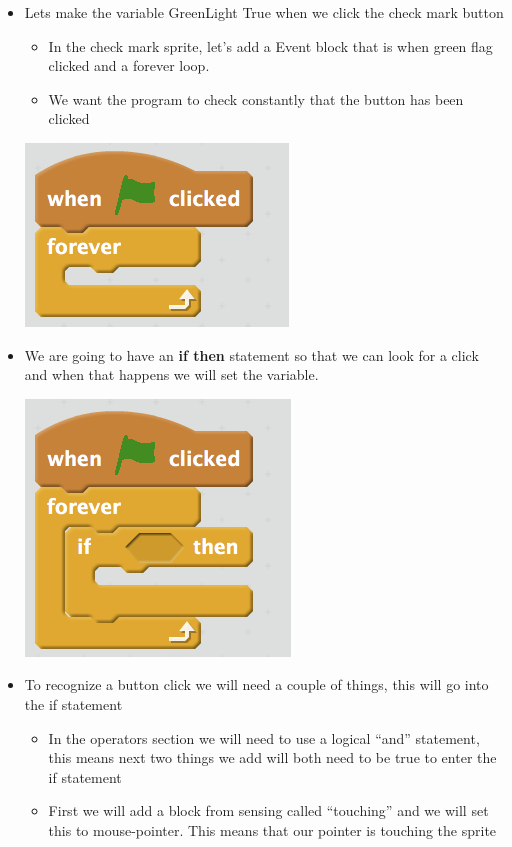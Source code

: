 \documentclass[12pt]{article}
\begin{document}
\begin{itemize}
		\item Lets make the variable GreenLight True when we click the check mark button
		\begin{itemize}
			\item In the check mark sprite, let's add a Event block that is when green flag clicked and a forever loop. 
			\item We want the program to check constantly that the button has been clicked
		\end{itemize}
		\begin{center}
			\includegraphics[scale=.8]{./Images/image5}
		\end{center}
		\item We are going to have an \textbf{if then} statement so that we can look for a click and when that happens we will set the variable.\begin{center}
			\includegraphics[scale=.8]{./Images/image6}
		\end{center}
		\item To recognize a button click we will need a couple of things, this will go into the if statement
			\begin{itemize}
				\item In the operators section we will need to use a logical “and” statement, this means next two things we add will both need to be true to enter the if statement
				\item First we will add a block from sensing called “touching” and we will set this to mouse-pointer.  This means that our pointer is touching the sprite

\end{itemize}
\end{itemize}
\end{document}
